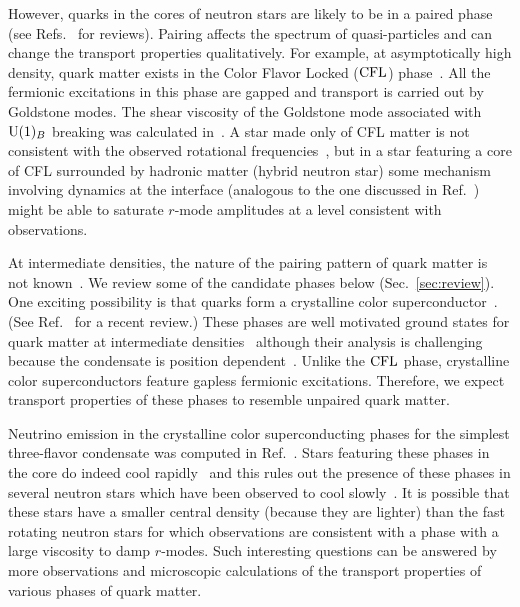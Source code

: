 \documentclass[10pt, aps, prd, superscriptaddress, nofootinbib, 
               amsmath, amssymb, twocolumn,
               preprintnumbers, showpacs,
               raggedbottom,
               floatfix]{revtex4-1}
\newcommand{\CFL}{{\rm{CFL}}}
\begin{document}
However, quarks in the cores of neutron stars are likely to be in a paired
phase (see Refs.~\cite{Rajagopal:2000wf,Alford:2000sx,Alford:2007xm} for reviews).
Pairing affects the spectrum of quasi-particles and can change the transport
properties qualitatively. For example, at asymptotically high density, quark
matter exists in the Color Flavor Locked ($\CFL$) phase~\cite{Alford:1998mk}.
All the fermionic excitations in this phase are gapped and transport is carried
out by Goldstone modes. The shear viscosity of the Goldstone mode associated
with ${\rm{U}}(1)_B$ breaking was calculated
in~\cite{Manuel:2004iv,Mannarelli:2008je}. A star made only of CFL matter is
not consistent with the observed rotational
frequencies~\cite{Manuel:2004iv,Rupak:2010qg}, but in a star featuring a core
of CFL surrounded by hadronic matter (hybrid neutron star) some mechanism
involving dynamics at the interface (analogous to the one discussed in
Ref.~\cite{Alford:2015gna}) might be able to saturate $r$-mode amplitudes at a
level consistent with observations.

At intermediate densities, the nature of the pairing pattern of quark matter is not
known~\cite{Alford:2007xm}. We review some of the candidate phases below
(Sec.~\ref{sec:review}). One
exciting possibility is that quarks form a crystalline
color superconductor~\cite{Alford:2000ze}. (See Ref.~\cite{Anglani:2013gfu} for a recent
review.) These phases are well motivated ground states for quark matter at
intermediate densities~\cite{Rajagopal:2006ig,Ippolito:2007uz} although their
analysis is challenging because the condensate is position 
dependent~\cite{Cao:2015rea}. Unlike the $\CFL$ phase, crystalline color superconductors feature gapless
fermionic excitations. Therefore, we expect transport properties of these phases to
resemble unpaired quark matter.

Neutrino emission in the crystalline color superconducting phases for the
simplest three-flavor condensate was computed in Ref.~\cite{Anglani:2006br}.
Stars featuring these phases in the core do indeed cool
rapidly~\cite{Anglani:2006br,Hess:2011} and this rules out the presence of
these phases in several neutron stars which have been observed to cool
slowly~\cite{Yakovlev:2000jp,Yakovlev:2003}. It is possible that these stars have a
smaller central density (because they are lighter) than the fast rotating
neutron stars for which observations are consistent with a phase with a large 
viscosity to damp $r$-modes. Such interesting questions can be answered by more observations and
microscopic calculations of the transport properties of various phases of quark
matter.
\end{document}
